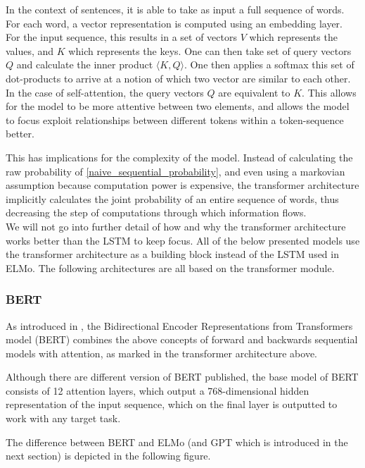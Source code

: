 \documentclass[a4paper,12pt,twoside,openright]{report}
\begin{document}
In the context of sentences, it is able to take as input a full sequence of words.
For each word, a vector representation is computed using an embedding layer.
For the input sequence, this results in a set of vectors $V$ which represents the values, and $K$ which represents the keys.
One can then take set of query vectors $Q$ and calculate the inner product $\langle K, Q \rangle$.
One then applies a softmax this set of dot-products to arrive at a notion of which two vector are similar to each other.
In the case of self-attention, the query vectors $Q$ are equivalent to $K$.
This allows for the model to be more attentive between two elements, and allows the model to focus exploit relationships between different tokens within a token-sequence better.


This has implications for the complexity of the model.
Instead of calculating the raw probability of \eqref{naive_sequential_probability}, and even using a markovian assumption because computation power is expensive, the transformer architecture implicitly calculates the joint probability of an entire sequence of words, thus decreasing the step of computations through which information flows. \\

We will not go into further detail of how and why the transformer architecture works better than the LSTM to keep focus.
All of the below presented models use the transformer architecture as a building block instead of the LSTM used in ELMo.
The following architectures are all based on the transformer module.

\subsubsection{BERT}\label{section:BERT}
 
As introduced in \cite{devlin18}, the Bidirectional Encoder Representations from Transformers model (BERT) combines the above concepts of forward and backwards sequential models with attention, as marked in the transformer architecture above.

Although there are different version of BERT published, the base model of BERT consists of 12 attention layers, which output a 768-dimensional hidden representation of the input sequence, which on the final layer is outputted to work with any target task.

The difference between BERT and ELMo (and GPT which is introduced in the next section) is depicted in the following figure.
\end{document}
